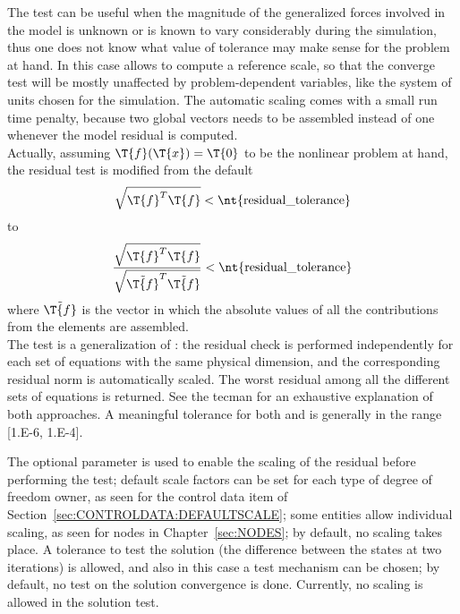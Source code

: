 The  test can be useful when the magnitude of the
generalized forces involved in the model is unknown or is known to vary
considerably during the simulation, thus one does not know what value 
of tolerance may make sense for the problem at hand.
In this case  allows to compute a reference scale, so that the
converge test will be mostly unaffected by problem-dependent variables, 
like the system of units chosen for the simulation. 
The automatic scaling comes with a small run time penalty, because two global vectors
needs to be assembled instead of one whenever the model residual is computed.\\
Actually, assuming $\T{f}(\T{x}) = \T{0}$ to be the nonlinear problem at hand, 
the residual test is modified from the default
\begin{equation}
  \sqrt{\T{f}^{T}\T{f}} < \text{\nt{residual\_tolerance}} 
\end{equation}
to
\begin{equation}
  \dfrac{\sqrt{\T{f}^{T}\T{f}}}{\sqrt{\tilde{\T{f}}^{T}\tilde{\T{f}}}}
  < \text{\nt{residual\_tolerance}}
\end{equation}
where $\tilde{\T{f}}$ is the vector in which the absolute values of all the contributions
from the elements are assembled.\\
The  test is a generalization of : the residual check is performed 
independently for each set of equations with the same physical dimension, and the
corresponding residual norm
is automatically scaled. The worst residual among all the different sets of equations is returned.
See the tecman for an exhaustive explanation of both approaches.
A meaningful tolerance for both  and  is generally in the range [1.E-6, 1.E-4].

The optional parameter  is used to enable the scaling
of the residual before performing the test; default scale factors 
can be set for each type of degree of freedom owner, as seen for the control data item of Section~\ref{sec:CONTROLDATA:DEFAULTSCALE}; some
entities allow individual scaling, as seen for nodes in Chapter~\ref{sec:NODES}; by default, no scaling takes place.
A tolerance  to test the solution 
(the difference between the states at two iterations) is allowed, 
and also in this case a test mechanism can be chosen;
by default, no test on the solution convergence is done.
Currently, no scaling is allowed in the solution test.

\noindent
